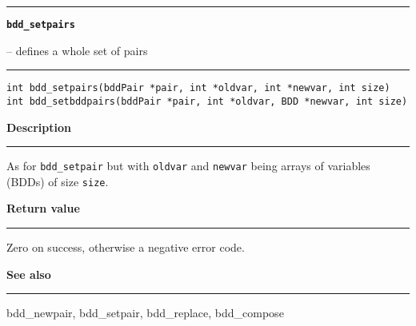 \vspace{8ex}
\begin{minipage}{\textwidth}

\noindent\begin{minipage}{\textwidth}
\rule{\textwidth}{0.5mm}
{\tt\bf bdd\_setpairs }
\--- defines a whole set of pairs  \hspace{\fill}
\\\rule[1.5ex]{\textwidth}{0.5mm}
\end{minipage}

\noindent\begin{verbatim}
int bdd_setpairs(bddPair *pair, int *oldvar, int *newvar, int size)
int bdd_setbddpairs(bddPair *pair, int *oldvar, BDD *newvar, int size) 
\end{verbatim}

\vspace{\parsep}\noindent
{\bf Description}\\\rule[1.5ex]{\textwidth}{0.2mm}\vspace{-1.5ex}\setlength{\parindent}{1em}
As for {\tt bdd\_setpair} but with {\tt oldvar} and {\tt newvar}
           being arrays of variables (BDDs) of size {\tt size}. 

\setlength{\parindent}{0em}\vspace{\parsep}\vspace{\baselineskip}\noindent
{\bf Return value}\\\rule[1.5ex]{\textwidth}{0.2mm}\vspace{-1.5ex}
Zero on success, otherwise a negative error code. 

\vspace{\parsep}\vspace{\baselineskip}\noindent
{\bf See also}\\\rule[1.5ex]{\textwidth}{0.2mm}\vspace{-1.5ex}
bdd\_newpair, bdd\_setpair, bdd\_replace, bdd\_compose 
\end{minipage}
\vspace{8ex}
